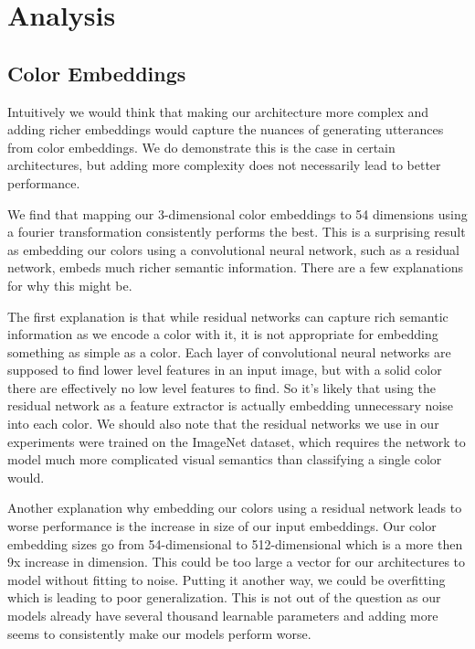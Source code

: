 \section{Analysis}

\subsection{Color Embeddings}

Intuitively we would think that making our architecture more complex and adding richer embeddings would capture the nuances of generating utterances from color embeddings. We do demonstrate this is the case in certain architectures, but adding more complexity does not necessarily lead to better performance.

\par
We find that mapping our 3-dimensional color embeddings to 54 dimensions using a fourier transformation consistently performs the best. This is a surprising result as embedding our colors using a convolutional neural network, such as a residual network, embeds much richer semantic information. There are a few explanations for why this might be.

\par
The first explanation is that while residual networks can capture rich semantic information as we encode a color with it, it is not appropriate for embedding something as simple as a color. Each layer of convolutional neural networks are supposed to find lower level features in an input image, but with a solid color there are effectively no low level features to find. So it’s likely that using the residual network as a feature extractor is actually embedding unnecessary noise into each color. We should also note that the residual networks we use in our experiments were trained on the ImageNet dataset, which requires the network to model much more complicated visual semantics than classifying a single color would.

\par
Another explanation why embedding our colors using a residual network leads to worse performance is the increase in size of our input embeddings. Our color embedding sizes go from 54-dimensional to 512-dimensional which is a more then 9x increase in dimension. This could be too large a vector for our architectures to model without fitting to noise. Putting it another way, we could be overfitting which is leading to poor generalization. This is not out of the question as our models already have several thousand learnable parameters and adding more seems to consistently make our models perform worse.

